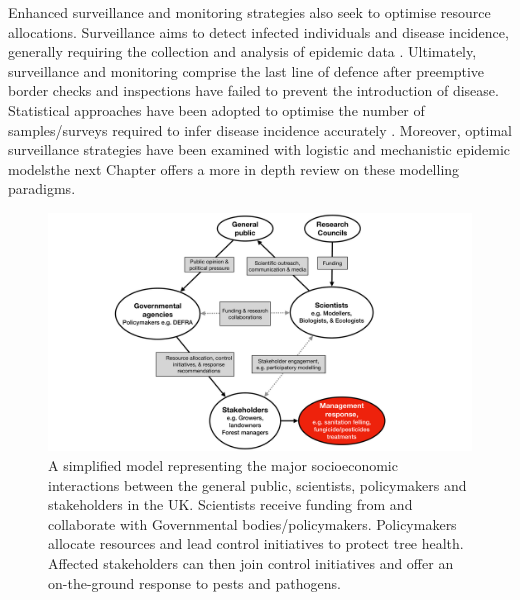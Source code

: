 Enhanced surveillance and monitoring strategies also seek to optimise resource allocations. 
Surveillance aims to detect infected individuals and disease incidence, generally requiring the collection and analysis of epidemic data \cite{surveillance-review}.
Ultimately, surveillance and monitoring comprise the last line of defence after preemptive border checks and inspections have failed to prevent the introduction of disease. 
Statistical approaches have been adopted to optimise the number of samples/surveys required to infer disease incidence accurately \cite{yamamura2016sampling}.
Moreover, optimal surveillance strategies have been examined with logistic \cite{parnell2012estimating} 
and mechanistic \cite{WEBIDEMICS} epidemic models\textemdash the next Chapter offers a more in depth review on these modelling paradigms.

\begin{figure}
    \centering
    \includegraphics[scale=0.35]{chapter1/figures/modelling-and-policy.pdf}
    \caption{A simplified model representing the major socioeconomic interactions between the general public, scientists, 
    policymakers and stakeholders in the UK. Scientists receive funding from and collaborate with Governmental bodies/policymakers. 
    Policymakers allocate resources and lead control initiatives to protect tree health. 
    Affected stakeholders can then join control initiatives and offer an on-the-ground response to pests and pathogens.}
    \label{fig:modelling-and-policies}
\end{figure}

